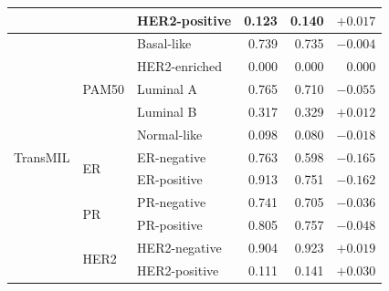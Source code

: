 \begin{table}[htbp]
\begin{tabular}{lllrrr}
    &   & HER2-positive & 0.123 & 0.140 & $+0.017$ \\
\midrule
  \multirow{11}{*}{TransMIL} & \multirow{5}{*}{PAM50} & Basal-like & 0.739 & 0.735 & $-0.004$ \\
    &   & HER2-enriched & 0.000 & 0.000 & $0.000$ \\
    &   & Luminal A & 0.765 & 0.710 & $-0.055$ \\
    &   & Luminal B & 0.317 & 0.329 & $+0.012$ \\
    &   & Normal-like & 0.098 & 0.080 & $-0.018$ \\
\cmidrule{2-6}
    & \multirow{2}{*}{ER} & ER-negative & 0.763 & 0.598 & $-0.165$ \\
    &   & ER-positive & 0.913 & 0.751 & $-0.162$ \\
\cmidrule{2-6}
    & \multirow{2}{*}{PR} & PR-negative & 0.741 & 0.705 & $-0.036$ \\
    &   & PR-positive & 0.805 & 0.757 & $-0.048$ \\
\cmidrule{2-6}
    & \multirow{2}{*}{HER2} & HER2-negative & 0.904 & 0.923 & $+0.019$ \\
    &   & HER2-positive & 0.111 & 0.141 & $+0.030$ \\
\bottomrule
\end{tabular}
\end{table}